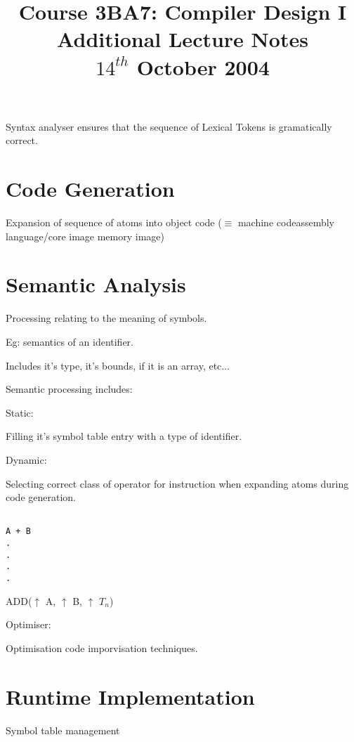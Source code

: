 \documentclass[a4paper,12pt]{article}
\begin{document}
\title{Course 3BA7: Compiler Design I \\ Additional Lecture Notes \\ $14^{th}$ October 2004}

\maketitle

Syntax analyser ensures that the sequence of Lexical Tokens is
gramatically correct.

\section{Code Generation}

Expansion of sequence of atoms into object code ($\equiv$ machine
codeassembly language/core image memory image)


\section{Semantic Analysis}

Processing relating to the meaning of symbols.

Eg: semantics of an identifier.

	Includes it's type, it's bounds, if it is an array, etc...

Semantic processing includes:

	Static:

		Filling it's symbol table entry with a type of identifier.

	Dynamic:	

		Selecting correct class of operator for instruction when expanding
		atoms during code generation.

\begin{verbatim}

A + B
.
.
.
.
\end{verbatim}

ADD($\uparrow$ A, $\uparrow$ B, $\uparrow$ $T_{n}$)


Optimiser:

Optimisation code imporvisation techniques.


\section{Runtime Implementation}

Symbol table management
\end{document}
